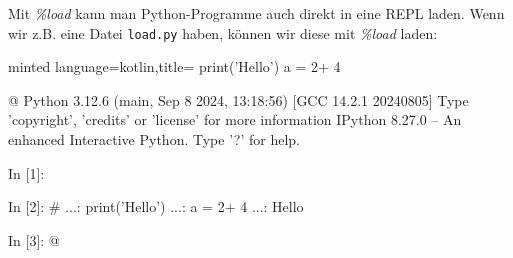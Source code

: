Mit \textit{\%load} kann man Python-Programme auch direkt in eine REPL laden. Wenn wir z.B. eine Datei \texttt{load.py} haben, können wir diese mit \textit{\%load} laden:
\begin{codeBlock}[]{minted language=kotlin,title=}
    print('Hello')
    a = 2+ 4
\end{codeBlock}
\begin{commandshell}[][minted language=text]
    @\shellprefix@ipython
    Python 3.12.6 (main, Sep  8 2024, 13:18:56) [GCC 14.2.1 20240805]
    Type 'copyright', 'credits' or 'license' for more information
    IPython 8.27.0 -- An enhanced Interactive Python. Type '?' for help.

    In [1]: %

    In [2]: # %
    ...: print('Hello')
    ...: a = 2+ 4
    ...:
    Hello

    In [3]: @\shellcursor@
\end{commandshell}

